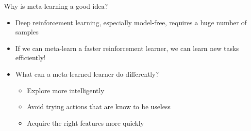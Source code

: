 \begin{frame}{Why is meta-learning a good idea?}
\begin{itemize}
    \item Deep reinforcement learning, especially model-free, requires a huge number of
          samples
    \item If we can meta-learn a faster reinforcement learner, we can learn new tasks
          efficiently!
    \item What can a meta-learned learner do differently?
    \begin{itemize}
        \item Explore more intelligently
        \item Avoid trying actions that are know to be useless
        \item Acquire the right features more quickly
    \end{itemize}
\end{itemize}
\end{frame}

